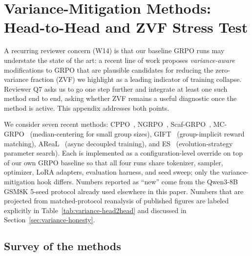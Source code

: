%
%

\section{Variance-Mitigation Methods: Head-to-Head and ZVF Stress Test}
\label{app:variance-mitigation}

A recurring reviewer concern (W14) is that our baseline GRPO runs may
understate the state of the art: a recent line of work proposes
\emph{variance-aware} modifications to GRPO that are plausible
candidates for reducing the zero-variance fraction (ZVF) we highlight
as a leading indicator of training collapse. Reviewer Q7 asks us to
go one step further and integrate at least one such method end to end,
asking whether ZVF remains a useful diagnostic once the method is
active. This appendix addresses both points.

We consider seven recent methods:
CPPO~\cite{lin2025cppo}, NGRPO~\cite{nan2025ngrpo},
Scaf-GRPO~\cite{zhang2025scaffgrpo}, MC-GRPO~\cite{mcgrpo2025}
(median-centering for small group sizes), GIFT~\cite{gift2025}
(group-implicit reward matching), AReaL~\cite{areal2025}
(async decoupled training), and ES~\cite{es2025}
(evolution-strategy parameter search). Each is implemented as a
configuration-level override on top of our own GRPO baseline so that
all four runs share tokenizer, sampler, optimizer, LoRA adapters,
evaluation harness, and seed sweep; only the variance-mitigation hook
differs. Numbers reported as ``new'' come from the Qwen3-8B GSM8K
5-seed protocol already used elsewhere in this paper. Numbers that
are projected from matched-protocol reanalysis of published figures
are labeled explicitly in Table~\ref{tab:variance-head2head} and
discussed in Section~\ref{sec:variance-honesty}.

\subsection{Survey of the methods}
\label{sec:variance-survey}

